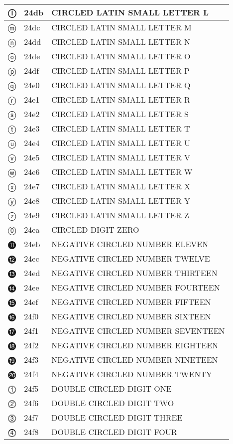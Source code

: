 \documentclass[12pt,letterpaper,openany]{book}
\begin{document}
\begin{center}
\begin{supertabular}{|m{0.25in}|m{0.5in}|m{4in}|}
ⓛ & 24db & CIRCLED LATIN SMALL LETTER L\\\hline
ⓜ & 24dc & CIRCLED LATIN SMALL LETTER M\\\hline
ⓝ & 24dd & CIRCLED LATIN SMALL LETTER N\\\hline
ⓞ & 24de & CIRCLED LATIN SMALL LETTER O\\\hline
ⓟ & 24df & CIRCLED LATIN SMALL LETTER P\\\hline
ⓠ & 24e0 & CIRCLED LATIN SMALL LETTER Q\\\hline
ⓡ & 24e1 & CIRCLED LATIN SMALL LETTER R\\\hline
ⓢ & 24e2 & CIRCLED LATIN SMALL LETTER S\\\hline
ⓣ & 24e3 & CIRCLED LATIN SMALL LETTER T\\\hline
ⓤ & 24e4 & CIRCLED LATIN SMALL LETTER U\\\hline
ⓥ & 24e5 & CIRCLED LATIN SMALL LETTER V\\\hline
ⓦ & 24e6 & CIRCLED LATIN SMALL LETTER W\\\hline
ⓧ & 24e7 & CIRCLED LATIN SMALL LETTER X\\\hline
ⓨ & 24e8 & CIRCLED LATIN SMALL LETTER Y\\\hline
ⓩ & 24e9 & CIRCLED LATIN SMALL LETTER Z\\\hline
⓪ & 24ea & CIRCLED DIGIT ZERO\\\hline
⓫ & 24eb & NEGATIVE CIRCLED NUMBER ELEVEN\\\hline
⓬ & 24ec & NEGATIVE CIRCLED NUMBER TWELVE\\\hline
⓭ & 24ed & NEGATIVE CIRCLED NUMBER THIRTEEN\\\hline
⓮ & 24ee & NEGATIVE CIRCLED NUMBER FOURTEEN\\\hline
⓯ & 24ef & NEGATIVE CIRCLED NUMBER FIFTEEN\\\hline
⓰ & 24f0 & NEGATIVE CIRCLED NUMBER SIXTEEN\\\hline
⓱ & 24f1 & NEGATIVE CIRCLED NUMBER SEVENTEEN\\\hline
⓲ & 24f2 & NEGATIVE CIRCLED NUMBER EIGHTEEN\\\hline
⓳ & 24f3 & NEGATIVE CIRCLED NUMBER NINETEEN\\\hline
⓴ & 24f4 & NEGATIVE CIRCLED NUMBER TWENTY\\\hline
⓵ & 24f5 & DOUBLE CIRCLED DIGIT ONE\\\hline
⓶ & 24f6 & DOUBLE CIRCLED DIGIT TWO\\\hline
⓷ & 24f7 & DOUBLE CIRCLED DIGIT THREE\\\hline
⓸ & 24f8 & DOUBLE CIRCLED DIGIT FOUR\\\hline

\end{supertabular}
\end{center}
\end{document}
